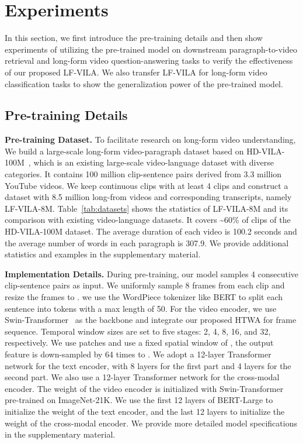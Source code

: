 \documentclass{article}
\begin{document}
\section{Experiments}
\label{exp}
In this section, we first introduce the pre-training details and then show experiments of utilizing the pre-trained model on downstream paragraph-to-video retrieval and long-form video question-answering tasks to verify the effectiveness of our proposed LF-VILA. We also transfer LF-VILA for long-form video classification tasks to show the generalization power of the pre-trained model.

\subsection{Pre-training Details}

\textbf{Pre-training Dataset.} 
To facilitate research on long-form video understanding, We build a large-scale long-form video-paragraph dataset based on HD-VILA-100M~\cite{xue2021hdvila}, which is an existing large-scale video-language dataset with diverse categories. It contains 100 million clip-sentence pairs derived from 3.3 million YouTube videos. We keep continuous clips with at least 4 clips and construct a dataset with 8.5 million long-from videos and corresponding transcripts, namely LF-VILA-8M. Table~\ref{tab:datasets} shows the statistics of LF-VILA-8M and its comparison with existing video-language datasets.
It covers \textasciitilde 60\% of clips of the HD-VILA-100M dataset.
The average duration of each video is 100.2 seconds and the average number of words in each paragraph is 
307.9. We provide additional statistics and examples in the supplementary material.


\textbf{Implementation Details.}
During pre-training, our model samples 4 consecutive clip-sentence pairs as input. We uniformly sample 8 frames from each clip and resize the frames to . we use the WordPiece tokenizer like BERT to split each sentence into tokens with a max length of 50.
For the video encoder, we use Swin-Transformer~\cite{liu2021swin} as the backbone and integrate our proposed HTWA for frame sequence. 
Temporal window sizes are set to five stages: 2, 4, 8, 16, and 32, respectively.
We use  patches and use a fixed spatial window of , the output feature is down-sampled by 64 times to .  We adopt a 12-layer Transformer network for the text encoder, with 8 layers for the first part and 4 layers for the second part. We also use a 12-layer Transformer network for the cross-modal encoder. The weight of the video encoder is initialized with Swin-Transformer pre-trained on ImageNet-21K. We use the first 12 layers of BERT-Large to initialize the weight of the text encoder, and the last 12 layers to initialize the weight of the cross-modal encoder. We provide more detailed model specifications in the supplementary material.
\end{document}
